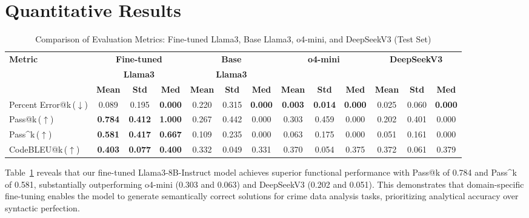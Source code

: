 \section{Quantitative Results}
\begin{table}[hbtp]
\centering
\footnotesize
\setlength{\tabcolsep}{2pt}
\begin{tabular}{l|ccc|ccc|ccc|ccc}
\toprule
\textbf{Metric} & \multicolumn{3}{c|}{\textbf{Fine-tuned}} & \multicolumn{3}{c|}{\textbf{Base}} & \multicolumn{3}{c|}{\textbf{o4-mini}} & \multicolumn{3}{c}{\textbf{DeepSeekV3}} \\
 & \multicolumn{3}{c|}{\textbf{Llama3}} & \multicolumn{3}{c|}{\textbf{Llama3}} & \multicolumn{3}{c|}{} & \multicolumn{3}{c}{} \\
\cmidrule(lr){2-4} \cmidrule(lr){5-7} \cmidrule(lr){8-10} \cmidrule(lr){11-13}
 & \textbf{Mean} & \textbf{Std} & \textbf{Med} & \textbf{Mean} & \textbf{Std} & \textbf{Med} & \textbf{Mean} & \textbf{Std} & \textbf{Med} & \textbf{Mean} & \textbf{Std} & \textbf{Med} \\
 \midrule
Percent Error@k\,($\downarrow$)  & 0.089 & 0.195 & \textbf{0.000} & 0.220 & 0.315 & \textbf{0.000} & \textbf{0.003} & \textbf{0.014} & \textbf{0.000} & 0.025 & 0.060 & \textbf{0.000} \\
Pass@k\,($\uparrow$)           & \textbf{0.784} & \textbf{0.412} & \textbf{1.000} & 0.267 & 0.442 & 0.000 & 0.303 & 0.459 & 0.000 & 0.202 & 0.401 & 0.000 \\
Pass\textasciicircum k\,($\uparrow$)     & \textbf{0.581} & \textbf{0.417} & \textbf{0.667} & 0.109 & 0.235 & 0.000 & 0.063 & 0.175 & 0.000 & 0.051 & 0.161 & 0.000 \\
CodeBLEU@k\,($\uparrow$)     & \textbf{0.403} & \textbf{0.077} & \textbf{0.400} & 0.332 & 0.049 & 0.331 & 0.370 & 0.054 & 0.375 & 0.372 & 0.061 & 0.379 \\
\bottomrule
\end{tabular}
\caption{Comparison of Evaluation Metrics: Fine-tuned Llama3, Base Llama3, o4-mini, and DeepSeekV3 (Test Set)}
\label{tab:combined_metrics}
\end{table}

Table~\ref{tab:combined_metrics} reveals that our fine-tuned Llama3-8B-Instruct model achieves superior functional performance with Pass@k of 0.784 and Pass\textasciicircum k of 0.581, substantially outperforming o4-mini (0.303 and 0.063) and DeepSeekV3 (0.202 and 0.051). This demonstrates that domain-specific fine-tuning enables the model to generate semantically correct solutions for crime data analysis tasks, prioritizing analytical accuracy over syntactic perfection.

